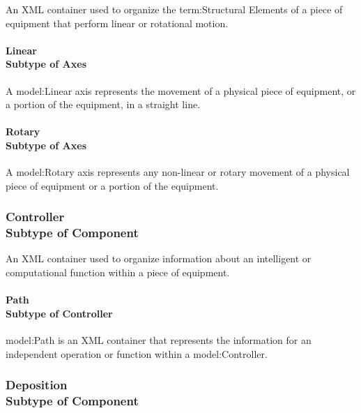 \FloatBarrier

An XML container used to organize the {term:Structural Elements} of a piece of equipment that perform linear or rotational motion.

\paragraph[Linear]{Linear \\ {\small Subtype of Axes}}\mbox{}
  \label{type:Linear}

\FloatBarrier

A {model:Linear} axis represents the movement of a physical piece of equipment, or a portion of the equipment, in a straight line. 

\paragraph[Rotary]{Rotary \\ {\small Subtype of Axes}}\mbox{}
  \label{type:Rotary}

\FloatBarrier

A {model:Rotary} axis represents any non-linear or rotary movement of a physical piece of equipment or a portion of the equipment.

\FloatBarrier
\subsubsection[Controller]{Controller \\ {\small Subtype of Component}}
  \label{type:Controller}

\FloatBarrier

An XML container used to organize information about an intelligent or computational function within a piece of equipment.

\paragraph[Path]{Path \\ {\small Subtype of Controller}}\mbox{}
  \label{type:Path}

\FloatBarrier

{model:Path} is an XML container that represents the information for an independent operation or function within a {model:Controller}.

\FloatBarrier
\subsubsection[Deposition]{Deposition \\ {\small Subtype of Component}}
  \label{type:Deposition}

